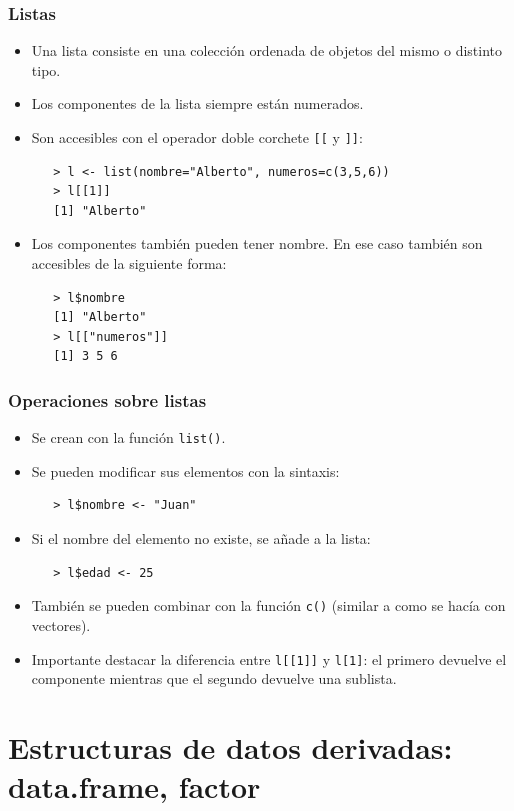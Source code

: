 \documentclass{beamer}
\begin{document}
\begin{frame}[fragile]
\frametitle{Listas}

\begin{itemize}
\item Una lista consiste en una colección ordenada de objetos del mismo o distinto tipo.
\item Los componentes de la lista siempre están numerados.
\item Son accesibles con el operador doble corchete \texttt{[[} y \texttt{]]}:
\begin{verbatim}
   > l <- list(nombre="Alberto", numeros=c(3,5,6))
   > l[[1]]
   [1] "Alberto"
\end{verbatim}
\item Los componentes también pueden tener nombre. En ese caso también son accesibles de la siguiente forma:
\begin{verbatim}
   > l$nombre
   [1] "Alberto"
   > l[["numeros"]]
   [1] 3 5 6
\end{verbatim}
\end{itemize}
\end{frame}

\begin{frame}[fragile]
\frametitle{Operaciones sobre listas}
\begin{itemize}
\item Se crean con la función \texttt{list()}.
\item Se pueden modificar sus elementos con la sintaxis:
\begin{verbatim}
   > l$nombre <- "Juan"
\end{verbatim}
\item Si el nombre del elemento no existe, se añade a la lista:
\begin{verbatim}
   > l$edad <- 25
\end{verbatim}
\item También se pueden combinar con la función \texttt{c()} (similar a como se hacía con vectores).
\item Importante destacar la diferencia entre \texttt{l[[1]]} y \texttt{l[1]}: el primero devuelve el componente mientras que el segundo devuelve una sublista.
\end{itemize}
\end{frame}


\section{Estructuras de datos derivadas: data.frame, factor}
\end{document}
